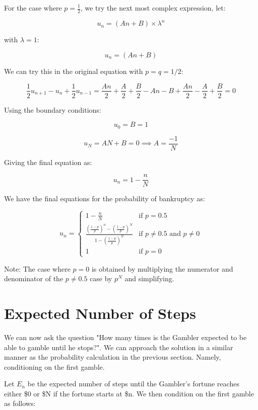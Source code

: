 \documentclass{article}
\begin{document}
For the case where $p = \frac{1}{2}$, we try the next most complex expression, let:

$$u_n = (An + B) \times \lambda^n$$

with $\lambda = 1$:

$$u_n = (An + B)$$

We can try this in the original equation with $p=q=1/2$:

$$\frac{1}{2} u_{n+1} - u_n + \frac{1}{2} u_{n-1} = \frac{An}{2} + \frac{A}{2} + \frac{B}{2} - An -B + \frac{An}{2} - \frac{A}{2} + \frac{B}{2} = 0$$

Using the boundary conditions:

$$u_0 = B = 1$$

$$u_N = AN + B = 0 \implies A = \frac{-1}{N}$$

Giving the final equation as:

\begin{equation}
    u_n = 1 - \frac{n}{N}
\end{equation}

We have the final equations for the probability of bankruptcy as:

\begin{equation}
   u_n=%
   \begin{cases}
     1 - \frac{n}{N} &\text{if $p = 0.5$} \\
     \frac{\left( \frac{1-p}{p} \right)^n-\left( \frac{1-p}{p} \right)^N}{1 - \left( \frac{1-p}{p} \right)^N} &\text{if $p \neq 0.5$ and $p \neq 0$} \\
     1 &\text{if $p = 0$}
   \end{cases}
\end{equation}

Note: The case where $p=0$ is obtained by multiplying the numerator and denominator of the $p\neq 0.5$ case by $p^N$ and simplifying.

\section{Expected Number of Steps} %

We can now ask the question "How many times is the Gambler expected to be able to gamble until he stops?". We can approach the solution in a similar manner as the probability calculation in the previous section. Namely, conditioning on the first gamble.

Let $E_n$ be the expected number of steps until the Gambler's fortune reaches either \$0 or \$N if the fortune starts at \$n. We then condition on the first gamble as follows:
\end{document}
